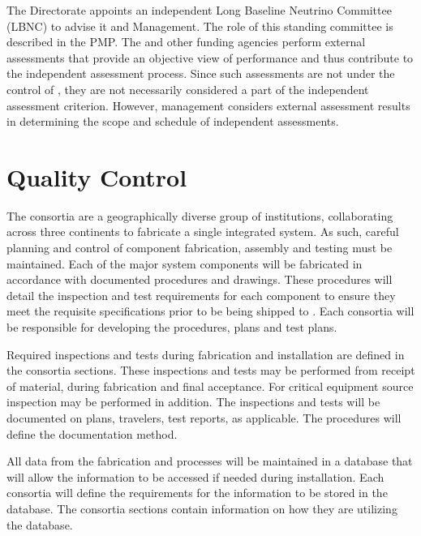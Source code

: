 The \fnal Directorate appoints an independent Long Baseline Neutrino
Committee (LBNC) to advise it and  Management. The role of
this standing committee is described in the 
PMP. The  and other funding agencies perform external
assessments that provide an objective view of performance and thus
contribute to the independent assessment process. Since such
assessments are not under the control of , they are not
necessarily considered a part of the independent assessment
criterion. However,  management considers external
assessment results in determining the scope and schedule of
independent assessments.

\section{ Quality Control}
  
The  consortia are a geographically diverse group of institutions,
collaborating across three continents to fabricate a single integrated
system. As such, careful planning and control of component
fabrication, assembly and testing must be maintained. Each of the
major system components will be fabricated in accordance with
documented procedures and drawings.  These procedures will detail the
inspection and test requirements for each component to ensure they
meet the requisite specifications prior to be being shipped to .
Each consortia will be responsible for developing the procedures, 
plans and test plans.

Required inspections and tests during fabrication and installation are
defined in the consortia  sections. These inspections and tests may
be performed from receipt of material, during fabrication and final
acceptance. For critical equipment source inspection may be performed
in addition. The inspections and tests will be documented on  plans,
travelers, test reports, as applicable.  The procedures will define
the documentation method.

All data from the fabrication and  processes will be maintained in a
database that will allow the information to be accessed if needed
during installation. Each consortia will define the requirements for
the information to be stored in the database. The consortia 
sections contain information on how they are utilizing the database.

